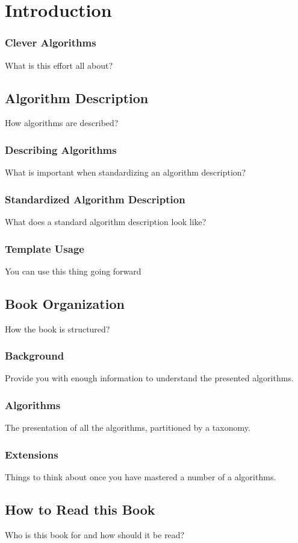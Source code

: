 \chapter{Introduction}
\label{chap:intro}

\subsection{Clever Algorithms}
What is this effort all about?


\section{Algorithm Description}
How algorithms are described?

\subsection{Describing Algorithms}
What is important when standardizing an algorithm description?

\subsection{Standardized Algorithm Description}
What does a standard algorithm description look like?

\subsection{Template Usage}
You can use this thing going forward


\section{Book Organization}
How the book is structured?

\subsection{Background}
Provide you with enough information to understand the presented algorithms.

\subsection{Algorithms}
The presentation of all the algorithms, partitioned by a taxonomy.

\subsection{Extensions}
Things to think about once you have mastered a number of a algorithms.



\section{How to Read this Book}
Who is this book for and how should it be read?